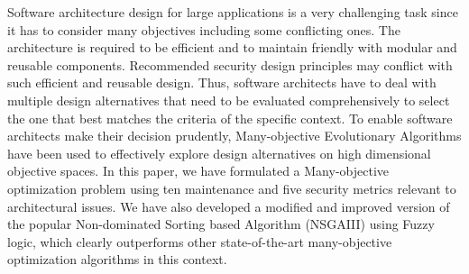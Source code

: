 
Software architecture design for large applications is a very challenging task since it has to consider many objectives including some conflicting ones. The architecture is required to be efficient and to maintain friendly with modular and reusable components. Recommended security design principles may conflict with such efficient and reusable design. Thus, software architects have to deal with multiple design alternatives that need to be evaluated comprehensively to select the one that best matches the criteria of the specific context. To enable software architects make their decision prudently, Many-objective Evolutionary Algorithms have been used to effectively explore design alternatives on high dimensional objective spaces. In this paper, we have formulated a Many-objective optimization problem using ten maintenance and five security metrics relevant to architectural issues. We have also developed a modified and improved version of the popular Non-dominated Sorting based Algorithm (NSGAIII) using Fuzzy logic, which clearly outperforms other state-of-the-art many-objective optimization algorithms in this context.



\endinput